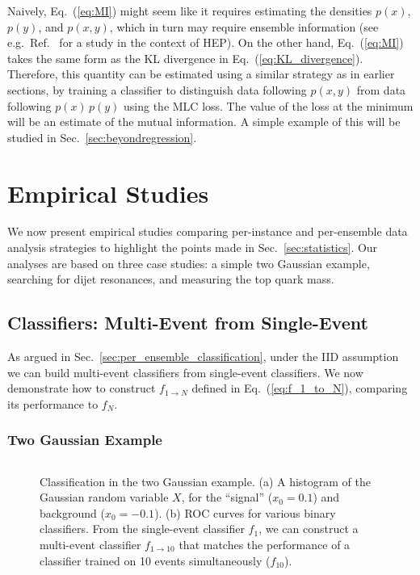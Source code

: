 \documentclass[aps,prx,reprint,preprintnumbers,superscriptaddress,nofootinbib,longbibliography,floatfix]{revtex4-2}
\DeclareRobustCommand{\Sec}[1]{Sec.~\ref{sec:#1}}
\DeclareRobustCommand{\Eq}[1]{Eq.~(\ref{eq:#1})}
\DeclareRobustCommand{\Ref}[1]{Ref.~\cite{#1}}
\begin{document}
Naively, \Eq{MI} might seem like it requires estimating the densities $p(x)$, $p(y)$, and $p(x,y)$, which in turn may require ensemble information (see e.g.~\Ref{carrara2019estimation} for a study in the context of HEP).
%
On the other hand, \Eq{MI} takes the same form as the KL divergence in \Eq{KL_divergence}.
%
Therefore, this quantity can be estimated using a similar strategy as in earlier sections, by training a classifier to distinguish data following $p(x,y)$ from data following $p(x)\, p(y)$ using the MLC loss.
%
The value of the loss at the minimum will be an estimate of the mutual information.
%
A simple example of this will be studied in \Sec{beyondregression}.


\section{Empirical Studies}
\label{sec:empirical}

We now present empirical studies comparing per-instance and per-ensemble data analysis strategies to highlight the points made in \Sec{statistics}.
%
Our analyses are based on three case studies: a simple two Gaussian example, searching for dijet resonances, and measuring the top quark mass.


\subsection{Classifiers: Multi-Event from Single-Event}
\label{sec:manyfromone}

As argued in \Sec{per_ensemble_classification}, under the IID assumption we can build multi-event classifiers from single-event classifiers.
%
We now demonstrate how to construct $f_{1\rightarrow N}$ defined in \Eq{f_1_to_N}, comparing its performance to $f_N$.

\subsubsection{Two Gaussian Example}
\label{sec:manyfromone_gaussian}

 \begin{figure*}[t]
 \centering
{} $\qquad$
 \caption{Classification in the two Gaussian example.
  (a) A histogram of the Gaussian random variable $X$, for the ``signal'' ($x_0 = 0.1$) and background ($x_0 = -0.1$).
  (b) ROC curves for various binary classifiers.  From the single-event classifier $f_1$, we can construct a multi-event classifier $f_{1 \to 10}$ that matches the performance of a classifier trained on 10 events simultaneously ($f_{10}$).
  }
 \label{fig:Gaussian}
 \end{figure*}
\end{document}
